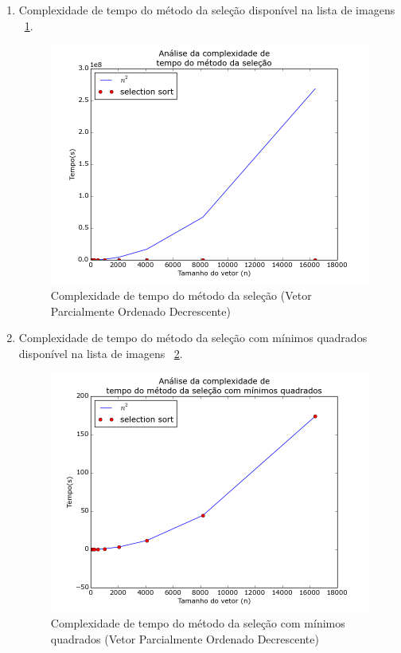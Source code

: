 \documentclass[12pt,a4paper,twoside]{report}
\begin{document}
\begin{enumerate}
\begin{enumerate}
											\item Complexidade de tempo do método da seleção disponível na lista de imagens ~\ref{fig:SelectionPlot2POD}.
											\begin{figure}[!h]
												\centering
												\includegraphics[scale=0.6]{../imagens/Selection/selection_plot_2_parcialmente_ordenado_decrescente.png}
												\caption{Complexidade de tempo do método da seleção (Vetor Parcialmente Ordenado Decrescente) \label{fig:SelectionPlot2POD}}
											\end{figure}


											\item Complexidade de tempo do método da seleção com mínimos quadrados disponível na lista de imagens  ~\ref{fig:SelectionPlot3POD}.
											\begin{figure}[!h]
												\centering
												\includegraphics[scale=0.6]{../imagens/Selection/selection_plot_3_parcialmente_ordenado_decrescente.png}
												\caption{Complexidade de tempo do método da seleção com mínimos quadrados (Vetor Parcialmente Ordenado Decrescente) \label{fig:SelectionPlot3POD}}
											\end{figure}

										\end{enumerate}


\end{enumerate}
\end{document}
